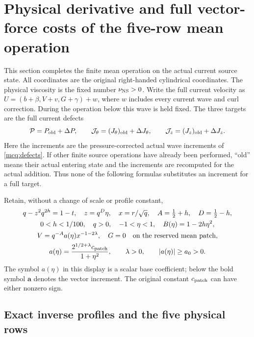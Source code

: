 \section{Physical derivative and full vector-force costs of the five-row mean operation}
\label{mcmean:section}

This section completes the finite mean operation on the actual current
source state. All coordinates are the original right-handed cylindrical
coordinates. The physical viscosity is the fixed number
\(\nu_{\rm NS}>0\). Write the full current velocity as
\(U=(b+\beta,V+v,G+\gamma)+w\), where \(w\) includes every current
wave and curl correction. During the operation below this wave is held
fixed. The three targets are the full current defects
\begin{equation}\label{mcmean:full_targets}
 \mathcal P=P_{\rm old}+\Delta P,\qquad
 \mathcal J_\theta=(J_\theta)_{\rm old}+\Delta J_\theta,\qquad
 \mathcal J_z=(J_z)_{\rm old}+\Delta J_z.
\end{equation}
Here the increments are the pressure-corrected actual wave increments
of \eqref{mcq:defects}. If other finite source operations have already
been performed, ``old'' means their actual entering state and the
increments are recomputed for the actual addition. Thus none of the
following formulas substitutes an increment for a full target.

Retain, without a change of scale or profile constant,
\begin{equation}\label{mcmean:original_scale}
\begin{gathered}
 q-z^2q^{2h}=1-t,\quad z=q^D\eta,\quad x=r/\sqrt q,\quad
 A=\tfrac12+h,\quad D=\tfrac12-h,\\
 0<h<1/100,\quad q>0,\quad -1<\eta<1,\quad
 B(\eta)=1-2h\eta^2,\\
 V=q^{-A}a(\eta)x^{-1-2\lambda},\quad G=0
 \quad\hbox{on the reserved mean patch},\\
 a(\eta)=\frac{2^{1/2+\lambda}c_{\rm patch}}{1+\eta^2},
 \qquad \lambda>0,\qquad |a(\eta)|\ge a_0>0.
\end{gathered}
\end{equation}
The symbol \(a(\eta)\) in this display is a scalar base coefficient;
below the bold symbol \(\boldsymbol a\) denotes the vector increment.
The original constant \(c_{\rm patch}\) can have either nonzero sign.

\subsection{Exact inverse profiles and the five physical rows}

